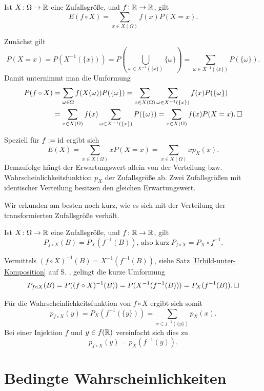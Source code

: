 \begin{Satz}
Ist $X\colon\Omega\to\mathbb R$ eine Zufallsgröße, und $f\colon\mathbb R\to\mathbb R$, gilt
\[E(f\circ X) = \sum_{x\in X(\Omega)}f(x)P(X=x).\]
\end{Satz}
\begin{Beweis}
Zunächst gilt
\[P(X=x)=P(X^{-1}(\{x\}))=P(\bigcup_{\omega\in X^{-1}(\{x\})}\{\omega\})
= \sum_{\omega\in X^{-1}(\{x\})}P(\{\omega\}).\]
Damit unternimmt man die Umformung
\begin{align*}
P(f\circ X) &= \sum_{\omega\in\Omega}f(X(\omega))P(\{\omega\})
= \sum_{x\in X(\Omega)}\sum_{\omega\in X^{-1}(\{x\})}f(x)P(\{\omega\})\\
&= \sum_{x\in X(\Omega)}f(x)\sum_{\omega\in X^{-1}(\{x\})} P(\{\omega\})
= \sum_{x\in X(\Omega)}f(x)P(X=x).\,\Box
\end{align*}
\end{Beweis}

\noindent
Speziell für $f:=\operatorname{id}$ ergibt sich
\[E(X) = \sum_{x\in X(\Omega)}xP(X=x) = \sum_{x\in X(\Omega)}xp_X(x).\]
Demzufolge hängt der Erwartungswert allein von der Verteilung bzw.
Wahrscheinlichkeitsfunktion $p_X$ der Zufallsgröße ab. Zwei Zufallsgrößen
mit identischer Verteilung besitzen den gleichen Erwartungswert.

Wir erkunden am besten noch kurz, wie es sich mit der Verteilung der
transformierten Zufallsgröße verhält.

\begin{Satz}
Ist $X\colon\Omega\to\mathbb R$ eine Zufallsgröße, und $f\colon\mathbb R\to\mathbb R$, gilt
\[P_{f\circ X}(B) = P_X(f^{-1}(B)),\,\text{also kurz}\; P_{f\circ X}
= P_X\circ f^{-1}.\]
\end{Satz}
\begin{Beweis}
Vermittels $(f\circ X)^{-1}(B) = X^{-1}(f^{-1}(B))$, siehe Satz
\ref{Urbild-unter-Komposition} auf S. \pageref{Urbild-unter-Komposition},
gelingt die kurze Umformung
\[P_{f\circ X}(B) = P((f\circ X)^{-1}(B))
= P(X^{-1}(f^{-1}(B))) = P_X(f^{-1}(B)).\,\Box\]
\end{Beweis}

\noindent
Für die Wahrscheinlichkeitsfunktion von $f\circ X$ ergibt sich somit
\[p_{f\circ X}(y) = P_X(f^{-1}(\{y\})) = \sum_{x\in f^{-1}(\{y\})}p_X(x).\]
Bei einer Injektion $f$ und $y\in f(\mathbb R)$ vereinfacht sich dies zu
\[p_{f\circ X}(y) = p_X(f^{-1}(y)).\]

\newpage
\section{Bedingte Wahrscheinlichkeiten}

